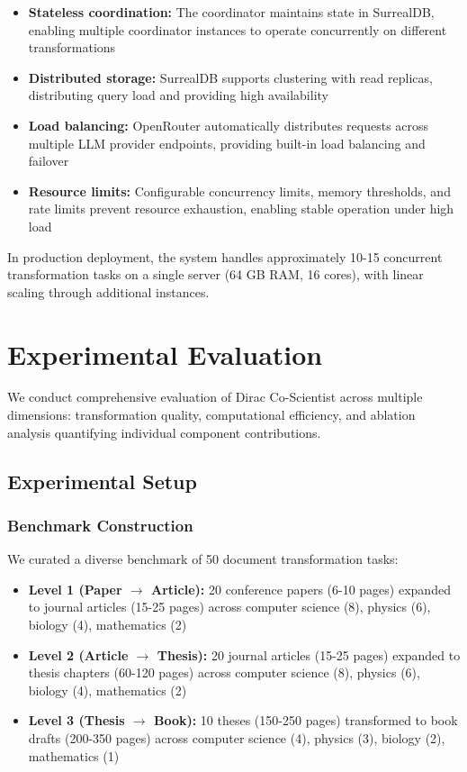 \documentclass{ieeeaccess}
\begin{document}
\begin{itemize}
\item \textbf{Stateless coordination:} The coordinator maintains state in SurrealDB, enabling multiple coordinator instances to operate concurrently on different transformations

\item \textbf{Distributed storage:} SurrealDB supports clustering with read replicas, distributing query load and providing high availability

\item \textbf{Load balancing:} OpenRouter automatically distributes requests across multiple LLM provider endpoints, providing built-in load balancing and failover

\item \textbf{Resource limits:} Configurable concurrency limits, memory thresholds, and rate limits prevent resource exhaustion, enabling stable operation under high load
\end{itemize}

In production deployment, the system handles approximately 10-15 concurrent transformation tasks on a single server (64 GB RAM, 16 cores), with linear scaling through additional instances.

\section{Experimental Evaluation}\label{sec:experiments}

We conduct comprehensive evaluation of Dirac Co-Scientist across multiple dimensions: transformation quality, computational efficiency, and ablation analysis quantifying individual component contributions.

\subsection{Experimental Setup}

\subsubsection{Benchmark Construction}

We curated a diverse benchmark of 50 document transformation tasks:

\begin{itemize}
\item \textbf{Level 1 (Paper $\rightarrow$ Article):} 20 conference papers (6-10 pages) expanded to journal articles (15-25 pages) across computer science (8), physics (6), biology (4), mathematics (2)

\item \textbf{Level 2 (Article $\rightarrow$ Thesis):} 20 journal articles (15-25 pages) expanded to thesis chapters (60-120 pages) across computer science (8), physics (6), biology (4), mathematics (2)

\item \textbf{Level 3 (Thesis $\rightarrow$ Book):} 10 theses (150-250 pages) transformed to book drafts (200-350 pages) across computer science (4), physics (3), biology (2), mathematics (1)
\end{itemize}
\end{document}
